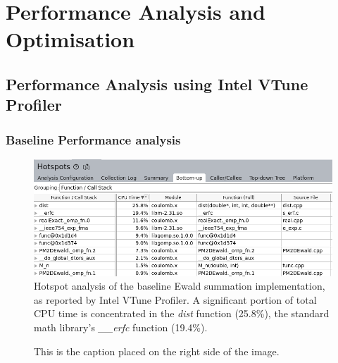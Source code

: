 
\chapter{Performance Analysis and Optimisation}

\label{Chapter6}


\section{Performance Analysis using Intel VTune Profiler}
\subsection{Baseline Performance analysis}
\begin{figure}[htbp]
    \centering
    \includegraphics[width = \linewidth]{images/VTuneInitialHotspot.png}
    \caption{Hotspot analysis of the baseline Ewald summation implementation, as reported by Intel VTune Profiler. A significant portion of total CPU time is concentrated in the \textit{dist} function (25.8\%), the standard math library's \textit{\_\_erfc} function (19.4\%).}
    \label{fig:result1}
\end{figure}
\begin{figure}[h]
    \centering
    \begin{minipage}{0.5\textwidth}
    \end{minipage}%
    \begin{minipage}{0.4\textwidth}
        \caption{This is the caption placed on the right side of the image.}
    \end{minipage}
\end{figure}
